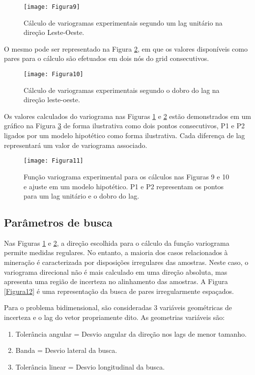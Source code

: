 \begin{figure}[H]
	\centering
	\texttt{[image: Figura9]}
	\caption{Cálculo de variogramas experimentais segundo um lag unitário na direção Leste-Oeste.}
	\label{Figura9}
\end{figure}

O mesmo pode ser representado na Figura \ref{Figura10}, em que os valores disponíveis como pares para o cálculo são efetuados em dois nós do grid consecutivos. 

\begin{figure}[H]
	\centering
	\texttt{[image: Figura10]}
	\caption{Cálculo de variogramas experimentais segundo o dobro do lag na direção leste-oeste.}
	\label{Figura10}
\end{figure}

Os valores calculados do variograma nas  Figuras \ref{Figura9} e \ref{Figura10} estão demonstrados em um gráfico na Figura \ref{Figura11} de forma ilustrativa como dois pontos consecutivos, P1 e P2 ligados por um modelo hipotético como forma ilustrativa. Cada diferença de lag representará um valor de variograma associado. 

\begin{figure}[H]
	\centering
	\texttt{[image: Figura11]}
	\caption{Função variograma experimental para os cálculos nas Figuras 9 e 10 e ajuste em um modelo hipotético. P1 e P2 representam os pontos para um lag unitário e o dobro do lag.}
	\label{Figura11}
\end{figure}

\subsection{Parâmetros de busca}

Nas Figuras \ref{Figura9} e \ref{Figura10}, a direção escolhida para o cálculo da função variograma permite medidas regulares. No entanto, a maioria dos casos relacionados à mineração é caracterizada por disposições irregulares das amostras. Neste caso, o variograma direcional não é mais calculado em uma direção absoluta, mas apresenta uma região de incerteza no alinhamento das amostras. A Figura \ref{Figura12} é uma representação da busca de pares irregularmente espaçados.

Para o problema bidimensional, são consideradas 3 variáveis geométricas de incerteza e o lag do vetor propriamente dito. As geometrias variáveis são:

\begin{enumerate}
	\item 	Tolerância angular = Desvio angular da direção nos lags de menor tamanho.
	\item 	Banda = Desvio lateral da busca. 
	\item	Tolerância linear = Desvio longitudinal da busca.
	
\end{enumerate}

